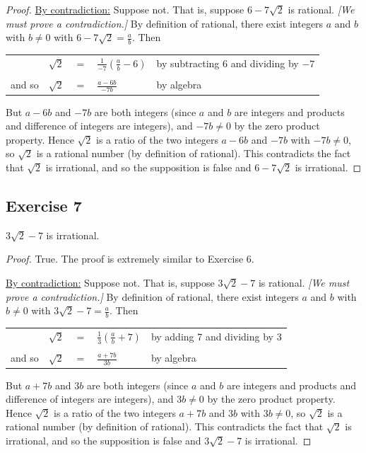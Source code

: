 \documentclass[14pt]{extarticle}
\newcommand{\dps}{\displaystyle}
\newcommand{\cy}{\color{cyan}}
\begin{document}
\begin{proof}
\underline{By contradiction:} Suppose not. That is, suppose
$6 - 7\sqrt{2}$ is rational. {\it [We must prove a contradiction.]} By definition of rational, there exist integers $a$ and $b$ with $b \neq 0$ with $6 - 7\sqrt{2} = \frac{a}{b}$. Then

\begin{center}
\begin{tabular}{lrcll}
& $\sqrt{2}$ & $=$ & $\dps\frac{1}{-7}\left(\frac{a}{b} - 6\right) $ & {\cy by subtracting 6 and dividing by $-7$} \\
\\
and so & $\sqrt{2}$ & = & $\dps\frac{a-6b}{-7b}$ & {\cy by algebra}\\
\end{tabular}
\end{center}

But $a - 6b$ and $-7b$ are both integers (since $a$ and $b$ are integers and products and difference of integers are integers), and $-7b \neq 0$ by the zero product property. Hence $\sqrt{2}$ is a ratio of the two integers $a - 6b$ and $-7b$ with $-7b \neq 0$, so $\sqrt{2}$ is a rational number (by definition of rational). This contradicts the fact that $\sqrt{2}$ is irrational, and so the supposition is false and $6 - 7 \sqrt{2}$ is irrational.
\end{proof}

\subsection{Exercise 7}
$3\sqrt{2} - 7$ is irrational.

\begin{proof}
True. The proof is extremely similar to Exercise 6. 

\underline{By contradiction:} Suppose not. That is, suppose
$3\sqrt{2} - 7$ is rational. {\it [We must prove a contradiction.]} By definition of rational, there exist integers $a$ and $b$ with $b \neq 0$ with $3\sqrt{2} - 7 = \frac{a}{b}$. Then

\begin{center}
\begin{tabular}{lrcll}
& $\sqrt{2}$ & $=$ & $\dps\frac{1}{3}\left(\frac{a}{b} + 7\right) $ & {\cy by adding 7 and dividing by 3} \\
\\
and so & $\sqrt{2}$ & = & $\dps\frac{a+7b}{3b}$ & {\cy by algebra}\\
\end{tabular}
\end{center}

But $a + 7b$ and $3b$ are both integers (since $a$ and $b$ are integers and products and difference of integers are integers), and $3b \neq 0$ by the zero product property. Hence $\sqrt{2}$ is a ratio of the two integers $a + 7b$ and $3b$ with $3b \neq 0$, so $\sqrt{2}$ is a rational number (by definition of rational). This contradicts the fact that $\sqrt{2}$ is irrational, and so the supposition is false and $3\sqrt{2} - 7$ is irrational.
\end{proof}
\end{document}
